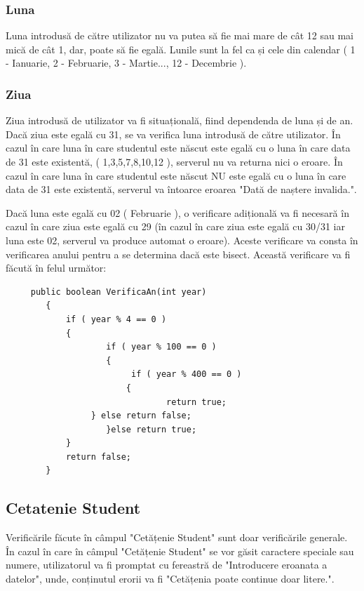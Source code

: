 \documentclass{article}
\begin{document}
		\subsubsection*{Luna}
		Luna introdusă de către utilizator nu va putea să fie mai mare de cât 12 sau mai mică de cât 1, dar, poate să fie egală. Lunile sunt la fel ca și cele din calendar ( 1 - Ianuarie, 2 - Februarie, 3 - Martie..., 12 - Decembrie ).

		\subsubsection*{Ziua}
		Ziua introdusă de utilizator va fi situațională, fiind dependenda de luna și de an. \\

		Dacă ziua este egală cu 31, se va verifica luna introdusă de către utilizator. În cazul în care luna în care studentul este născut este egală cu o luna în care data de 31 este existentă, ( 1,3,5,7,8,10,12 ), serverul nu va returna nici o eroare. În cazul în care luna în care studentul este născut NU este egală cu o luna în care data de 31 este existentă, serverul va întoarce eroarea "Dată de naștere invalida.".

		Dacă luna este egală cu 02 ( Februarie ), o verificare adițională va fi necesară în cazul în care ziua este egală cu 29 (în cazul în care ziua este egală cu 30/31 iar luna este 02, serverul va produce automat o eroare). Aceste verificare va consta în verificarea anului pentru a se determina dacă este bisect. Această verificare va fi făcută în felul următor:

	\begin{verbatim}
   	 public boolean VerificaAn(int year)
    	{
       	 	if ( year % 4 == 0 )
       		{
            		if ( year % 100 == 0 )
            		{
               			 if ( year % 400 == 0 )
                		{
                    			return true;
                 } else return false;
            		}else return true;
        	}
       		return false;
    	}
	\end{verbatim}

		\subsection*{Cetatenie Student}

		Verificările făcute în câmpul "Cetățenie Student" sunt doar verificările generale. În cazul în care în câmpul "Cetățenie Student" se vor găsit caractere speciale sau numere, utilizatorul va fi promptat cu fereastră de "Introducere eroanata a datelor", unde, conținutul erorii va fi "Cetățenia poate continue doar litere.".
\end{document}
